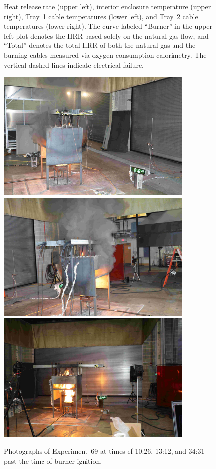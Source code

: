 \begin{figure}[H]
\caption[HRR and temperatures of Experiment 69]{Heat release rate (upper left), interior enclosure temperature (upper right), Tray~1 cable temperatures (lower left), and Tray~2 cable temperatures (lower right). The curve labeled ``Burner'' in the upper left plot denotes the HRR based solely on the natural gas flow, and ``Total'' denotes the total HRR of both the natural gas and the burning cables measured via oxygen-consumption calorimetry. The vertical dashed lines indicate electrical failure.}
\label{fig:Test_69}
\end{figure}

\begin{figure}[p]
\centering
\includegraphics[height=2.50in]{../FIGURES/Test_69_Photo_1} \\ \vspace{0.1in}
\includegraphics[height=2.50in]{../FIGURES/Test_69_Photo_2} \\ \vspace{0.1in}
\includegraphics[height=2.50in]{../FIGURES/Test_69_Photo_3}
\caption[Photographs of Experiment~69]{Photographs of Experiment~69 at times of 10:26, 13:12, and 34:31 past the time of burner ignition.}
\label{fig:Test_69_photos}
\end{figure}



